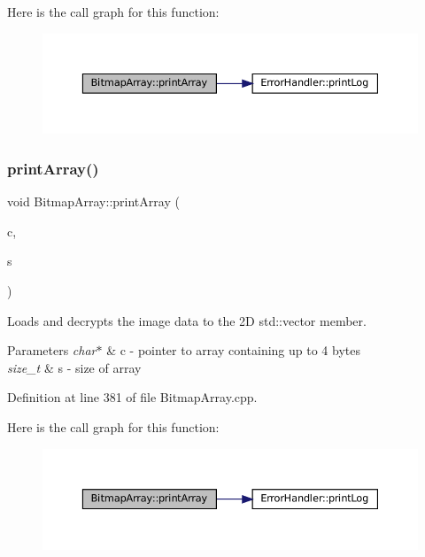 Here is the call graph for this function\+:
\nopagebreak
\begin{figure}[H]
\begin{center}
\leavevmode
\includegraphics[width=350pt]{classBitmapArray_a0580ddeedca7f59fd8d43ec92e6bb4a1_cgraph}
\end{center}
\end{figure}
\mbox{\label{classBitmapArray_a99a8a164e51e29407f24dab4752232c1}} 
\subsubsection{\texorpdfstring{printArray()}{printArray()}\hspace{0.1cm}{\footnotesize\ttfamily [2/2]}}
{\footnotesize\ttfamily void Bitmap\+Array\+::print\+Array (\begin{DoxyParamCaption}\item[{char $\ast$}]{c,  }\item[{size\+\_\+t}]{s }\end{DoxyParamCaption})\hspace{0.3cm}{\ttfamily [private]}}



Loads and decrypts the image data to the 2D std\+::vector member. 


\begin{DoxyParams}{Parameters}
{\em char$\ast$} & c -\/ pointer to array containing up to 4 bytes \\
\hline
{\em size\+\_\+t} & s -\/ size of array \\
\hline
\end{DoxyParams}


Definition at line 381 of file Bitmap\+Array.\+cpp.

Here is the call graph for this function\+:
\nopagebreak
\begin{figure}[H]
\begin{center}
\leavevmode
\includegraphics[width=350pt]{classBitmapArray_a99a8a164e51e29407f24dab4752232c1_cgraph}
\end{center}
\end{figure}
\mbox{\label{classBitmapArray_a3a5834d03cd095769b422d4d66b9435f}} 
